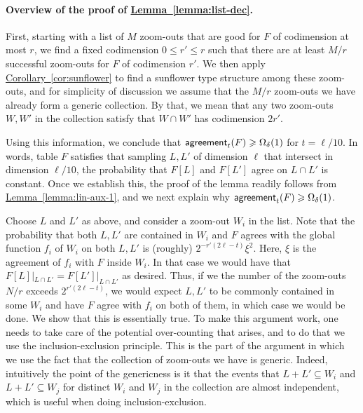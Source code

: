 \documentclass[11pt]{article}
\numberwithin{equation}{section}
\theoremstyle{definition}
\theoremstyle{plain}
\newcommand{\expref}[2]{\hyperref[#2]{#1~\ref{#2}}}
\renewcommand\geq{\geqslant}
\renewcommand\leq{\leqslant}
\def\agr{{\sf agreement}}
\begin{document}
\paragraph{Overview of the proof of \expref{Lemma}{lemma:list-dec}.} %
First, starting with a list of $M$ zoom-outs
that are good for $F$ of codimension at most $r$, we find a fixed codimension $0\leq r'\leq r$ such that there are at least $M/r$ successful
zoom-outs for $F$ of codimension $r'$. We then apply \expref{Corollary}{cor:sunflower} to find a sunflower type structure among these zoom-outs,
and for simplicity of discussion we assume that the $M/r$ zoom-outs we have already form a generic collection. By that, we mean that
any two zoom-outs $W,W'$ in the collection satisfy that $W\cap W'$ has codimension $2r'$.

Using this information, we conclude that $\agr_{t}(F)\geq \Omega_{\delta}(1)$ for $t=\ell/10$. In words, table $F$ satisfies that sampling $L,L'$ of dimension $\ell$ that intersect in dimension $\ell/10$, the probability that $F[L]$ and $F[L']$ agree on $L\cap L'$ is constant. Once we establish this, the proof of the lemma readily follows from \expref{Lemma}{lemma:lin-aux-1}, and we next explain why $\agr_{t}(F)\geq \Omega_{\delta}(1)$.

Choose $L$ and $L'$ as above, and consider a zoom-out $W_i$ in the list. Note that the probability that both $L,L'$ are contained in $W_i$ and
$F$ agrees with the global function $f_i$ of $W_i$ on both $L,L'$ is (roughly) $2^{-r'(2\ell-t)}\xi^2$. Here, $\xi$ is the agreement of $f_i$ with
$F$ inside $W_i$. In that case we would have that $F[L]|_{L\cap L'} = F[L']|_{L\cap L'}$ as desired. Thus, if we the number of the zoom-outs $N/r$ exceeds $2^{r'(2\ell-t)}$, we would expect $L,L'$ to be commonly contained in some $W_i$ and have $F$ agree with $f_i$ on both of them, in which case
we would be done. We show that this is essentially true. To make this argument work, one needs to take care of the potential
over-counting that arises, and to do that we use the inclusion-exclusion principle. This is the part of the argument in which we use
the fact that the collection of zoom-outs we have is generic. Indeed, intuitively
the point of the genericness is it that the events that $L+L'\subseteq W_i$ and $L+L'\subseteq W_{j}$ for distinct $W_i$ and $W_j$ in the collection are almost independent, which is useful when doing inclusion-exclusion.
\end{document}

